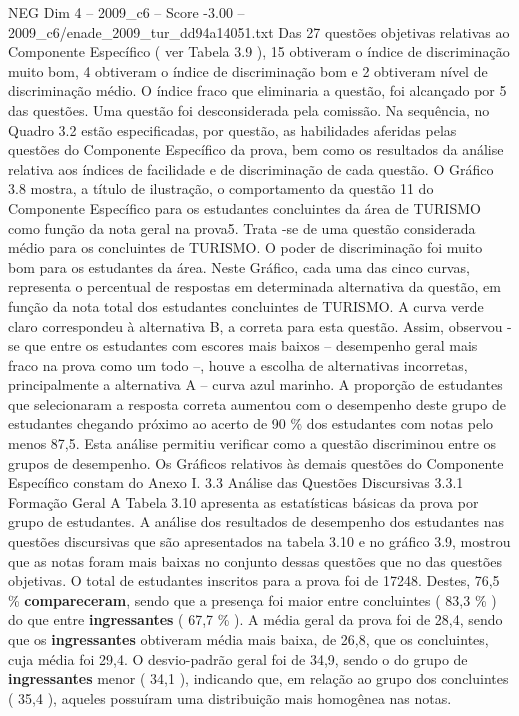 \begin{textsample}{NEG Dim 4 – 2009\_c6 – Score -3.00 – 2009\_c6/enade\_2009\_tur\_dd94a14051.txt}
Das 27 questões objetivas relativas ao Componente Específico ( ver Tabela 3.9 ), 15 obtiveram o índice de discriminação muito bom, 4 obtiveram o índice de discriminação bom e 2 obtiveram nível de discriminação médio.
O índice fraco que eliminaria a questão, foi alcançado por 5 das questões.
Uma questão foi desconsiderada pela comissão.
Na sequência, no Quadro 3.2 estão especificadas, por questão, as habilidades aferidas pelas questões do Componente Específico da prova, bem como os resultados da análise relativa aos índices de facilidade e de discriminação de cada questão.
O Gráfico 3.8 mostra, a título de ilustração, o comportamento da questão 11 do Componente Específico para os estudantes concluintes da área de TURISMO como função da nota geral na prova5.
Trata -se de uma questão considerada médio para os concluintes de TURISMO.
O poder de discriminação foi muito bom para os estudantes da área.
Neste Gráfico, cada uma das cinco curvas, representa o percentual de respostas em determinada alternativa da questão, em função da nota total dos estudantes concluintes de TURISMO.
A curva verde claro correspondeu à alternativa B, a correta para esta questão.
Assim, observou -se que entre os estudantes com escores mais baixos – desempenho geral mais fraco na prova como um todo –, houve a escolha de alternativas incorretas, principalmente a alternativa A – curva azul marinho.
A proporção de estudantes que selecionaram a resposta correta aumentou com o desempenho deste grupo de estudantes chegando próximo ao acerto de 90 \% dos estudantes com notas pelo menos 87,5.
Esta análise permitiu verificar como a questão discriminou entre os grupos de desempenho.
Os Gráficos relativos às demais questões do Componente Específico constam do Anexo I. 3.3 Análise das Questões Discursivas 3.3.1 Formação Geral A Tabela 3.10 apresenta as estatísticas básicas da prova por grupo de estudantes.
A análise dos resultados de desempenho dos estudantes nas questões discursivas que são apresentados na tabela 3.10 e no gráfico 3.9, mostrou que as notas foram mais baixas no conjunto dessas questões que no das questões objetivas.
O total de estudantes inscritos para a prova foi de 17248.
Destes, 76,5 \% \textbf{compareceram}, sendo que a presença foi maior entre concluintes ( 83,3 \% ) do que entre \textbf{ingressantes} ( 67,7 \% ).
A média geral da prova foi de 28,4, sendo que os \textbf{ingressantes} obtiveram média mais baixa, de 26,8, que os concluintes, cuja média foi 29,4.
O desvio-padrão geral foi de 34,9, sendo o do grupo de \textbf{ingressantes} menor ( 34,1 ), indicando que, em relação ao grupo dos concluintes ( 35,4 ), aqueles possuíram uma distribuição mais homogênea nas notas.

\end{textsample}

